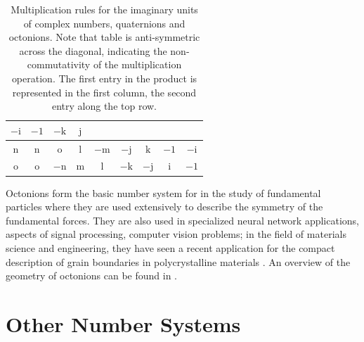 \begin{table}
\begin{tabular}{|c|c|c|c|c|c|c|c|c|}
 \textcolor{OCHighlandsSkyBlue}{$-\mathrm{i}$} & \textcolor{OCHighlandsSkyBlue}{$-1$} &  \textcolor{OCHighlandsSkyBlue}{$-\mathrm{k}$} &\textcolor{OCHighlandsSkyBlue}{$\mathrm{j}$} \\
\hline
 $\mathrm{n}$ &\textcolor{OCHighlandsSkyBlue}{$\mathrm{n}$} & \textcolor{OCHighlandsSkyBlue}{$\mathrm{o}$}  & \textcolor{OCHighlandsSkyBlue}{$\mathrm{l}$} & \textcolor{OCHighlandsSkyBlue}{$-\mathrm{m}$} & 
 \textcolor{OCHighlandsSkyBlue}{$-\mathrm{j}$} & \textcolor{OCHighlandsSkyBlue}{$\mathrm{k}$} &  \textcolor{OCHighlandsSkyBlue}{$-1$} &\textcolor{OCHighlandsSkyBlue}{$-\mathrm{i}$} \\
\hline
 $\mathrm{o}$ &\textcolor{OCHighlandsSkyBlue}{$\mathrm{o}$} & \textcolor{OCHighlandsSkyBlue}{$-\mathrm{n}$}  & \textcolor{OCHighlandsSkyBlue}{$\mathrm{m}$} & \textcolor{OCHighlandsSkyBlue}{$\mathrm{l}$} & 
 \textcolor{OCHighlandsSkyBlue}{$-\mathrm{k}$} & \textcolor{OCHighlandsSkyBlue}{$-\mathrm{j}$} &  \textcolor{OCHighlandsSkyBlue}{$\mathrm{i}$} &\textcolor{OCHighlandsSkyBlue}{$-1$} \\
\hline
\end{tabular}
\caption{\label{\chabbr:tb:octmult}Multiplication rules for the imaginary units of \textcolor{OCGreenThread}{complex numbers}, \textcolor{OCCarnegieRed}{quaternions} and \textcolor{OCHighlandsSkyBlue}{octonions}. Note that table is  anti-symmetric across the diagonal, indicating the non-commutativity of the multiplication operation. The first entry in the product is represented in the first column, the second entry along the top row.}
\end{table} 

Octonions form the basic number system for  in the study of fundamental particles where they are used extensively to describe the symmetry of the fundamental forces.  They are also used in specialized neural network applications, aspects of signal processing, computer vision problems; in the field of materials science and engineering, they have seen a recent application for the compact description of grain boundaries in polycrystalline materials \cite{degraef2019h}.  An overview of the geometry of octonions can be found in \cite{dray2015a}.



\section{Other Number Systems}
\label{\chabbr:sec:othernumbers}

